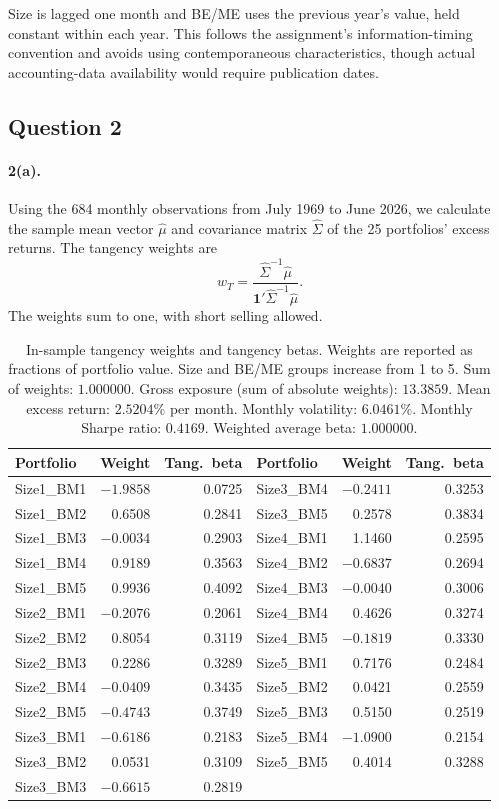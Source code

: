 Size is lagged one month and BE/ME uses the previous year's value, held
constant within each year. This follows the assignment's information-timing
convention and avoids using contemporaneous characteristics, though actual
accounting-data availability would require publication dates.

\subsection{Question 2}

\paragraph{2(a).} Using the 684 monthly observations from July 1969 to June
2026, we calculate the sample mean vector $\hat\mu$ and covariance matrix
$\hat\Sigma$ of the 25 portfolios' excess returns. The tangency weights are
\[
w_T = \frac{\hat\Sigma^{-1}\hat\mu}{\mathbf{1}'\hat\Sigma^{-1}\hat\mu}.
\]
The weights sum to one, with short selling allowed.

\begin{table}[H]
\centering
\caption{In-sample tangency weights and tangency betas. Weights are reported
as fractions of portfolio value. Size and BE/ME groups increase from 1 to 5.
Sum of weights: $1.000000$. Gross exposure (sum of absolute weights):
$13.3859$. Mean excess return: $2.5204\%$ per month. Monthly volatility:
$6.0461\%$. Monthly Sharpe ratio: $0.4169$. Weighted average beta:
$1.000000$.}
\small
\begin{tabular}{lrrlrr}
\toprule
Portfolio & Weight & Tang.\ beta & Portfolio & Weight & Tang.\ beta \\
\midrule
Size1\_BM1 & $-1.9858$ & 0.0725 & Size3\_BM4 & $-0.2411$ & 0.3253 \\
Size1\_BM2 & 0.6508 & 0.2841 & Size3\_BM5 & 0.2578 & 0.3834 \\
Size1\_BM3 & $-0.0034$ & 0.2903 & Size4\_BM1 & 1.1460 & 0.2595 \\
Size1\_BM4 & 0.9189 & 0.3563 & Size4\_BM2 & $-0.6837$ & 0.2694 \\
Size1\_BM5 & 0.9936 & 0.4092 & Size4\_BM3 & $-0.0040$ & 0.3006 \\
Size2\_BM1 & $-0.2076$ & 0.2061 & Size4\_BM4 & 0.4626 & 0.3274 \\
Size2\_BM2 & 0.8054 & 0.3119 & Size4\_BM5 & $-0.1819$ & 0.3330 \\
Size2\_BM3 & 0.2286 & 0.3289 & Size5\_BM1 & 0.7176 & 0.2484 \\
Size2\_BM4 & $-0.0409$ & 0.3435 & Size5\_BM2 & 0.0421 & 0.2559 \\
Size2\_BM5 & $-0.4743$ & 0.3749 & Size5\_BM3 & 0.5150 & 0.2519 \\
Size3\_BM1 & $-0.6186$ & 0.2183 & Size5\_BM4 & $-1.0900$ & 0.2154 \\
Size3\_BM2 & 0.0531 & 0.3109 & Size5\_BM5 & 0.4014 & 0.3288 \\
Size3\_BM3 & $-0.6615$ & 0.2819 &            &         &        \\
\bottomrule
\end{tabular}
\label{tab:p2w}
\end{table}

